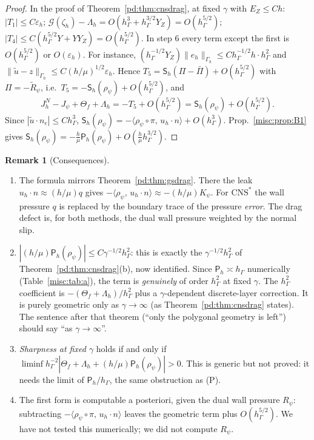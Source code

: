\documentclass[11pt,reqno]{amsart}
\theoremstyle{plain}
\theoremstyle{definition}
\newtheorem{remark}[theorem]{Remark}
\newcommand{\hG}{h_\Gamma}
\newcommand{\Gh}{\Gamma_h}
\newcommand{\ut}{\tilde u}
\newcommand{\ip}[2]{\langle #1,\, #2\rangle}
\newcommand{\norm}[1]{\lVert #1\rVert}
\newcommand{\CNS}{\mathrm{CNS}^\ast}
\newcommand{\eps}{\varepsilon_h}
\newcommand{\Gc}{\mathcal G}
\newcommand{\Pm}{\mathsf P_h}     %
\newcommand{\Sm}{\mathsf S_h}     %
\begin{document}
\begin{proof}
In the proof of Theorem~\ref{pd:thm:cnsdrag}, at fixed $\gamma$ with $E_Z\le Ch$: $|T_1|\le C\eps$; $\Gc(\zeta_h)-\Lambda_h=O(\hG^3+\hG^{3/2}Y_Z)=O(\hG^{5/2})$; $|T_4|\le C(\hG^{5/2}Y+YY_Z)=O(\hG^{5/2})$. In step 6 every term except the first is $O(\hG^{5/2})$ or $O(\eps)$. For instance, $(\hG^{-1/2}Y_Z)\norm{e_h}_{\Gh}\le C\hG^{-1/2}h\cdot\hG^2$ and $\norm{\ut-z}_{\Gh}\le C(h/\mu)^{1/2}\eps$. Hence $T_5=\Sm(\Pi-\bar\Pi)+O(\hG^{5/2})$ with $\Pi=-\tilde R_\psi$, i.e.\ $T_5=-\Sm(\rho_\psi)+O(\hG^{5/2})$, and
\[
J^N_h-J_\psi+\Theta_f+\Lambda_h=-T_5+O(\hG^{5/2})=\Sm(\rho_\psi)+O(\hG^{5/2}).
\]
Since $|\ut\cdot n_e|\le C\hG^3$, $\Sm(\rho_\psi)=-\ip{\rho_\psi\circ\pi}{u_h\cdot n}+O(\hG^3)$. Prop.~\ref{misc:prop:B1} gives $\Sm(\rho_\psi)=-\frac h\mu\Pm(\rho_\psi)+O(\frac h\mu\hG^{3/2})$.
\end{proof}

\begin{remark}[Consequences]\label{misc:rem:B2}
\begin{enumerate}
\item The formula mirrors Theorem~\ref{pd:thm:gsdrag}. There the leak $u_h\cdot n\approx(h/\mu)q$ gives $-\ip{\rho_\psi}{u_h\cdot n}\approx-(h/\mu)K_\psi$. For $\CNS$ the wall pressure $q$ is replaced by the boundary trace of the pressure \emph{error}. The drag defect is, for both methods, the dual wall pressure weighted by the normal slip.
\item $|(h/\mu)\Pm(\rho_\psi)|\le C\gamma^{-1/2}\hG^2$: this is exactly the $\gamma^{-1/2}\hG^2$ of Theorem~\ref{pd:thm:cnsdrag}(b), now identified. Since $\Pm\asymp\hG$ numerically (Table~\ref{misc:tab:a}), the term is \emph{genuinely} of order $\hG^2$ at fixed $\gamma$. The $\hG^2$ coefficient is $-(\Theta_f+\Lambda_h)/\hG^2$ plus a $\gamma$-dependent discrete-layer correction. It is purely geometric only as $\gamma\to\infty$ (as Theorem~\ref{pd:thm:cnsdrag} states). The sentence after that theorem (``only the polygonal geometry is left'') should say ``as $\gamma\to\infty$''.
\item \emph{Sharpness at fixed $\gamma$} holds if and only if $\liminf\hG^{-2}|\Theta_f+\Lambda_h+(h/\mu)\Pm(\rho_\psi)|>0$. This is generic but not proved: it needs the limit of $\Pm/\hG$, the same obstruction as (P).
\item The first form is computable a posteriori, given the dual wall pressure $R_\psi$: subtracting $-\ip{\rho_\psi\circ\pi}{u_h\cdot n}$ leaves the geometric term plus $O(\hG^{5/2})$. We have not tested this numerically; we did not compute $R_\psi$.
\end{enumerate}
\end{remark}
\end{document}
